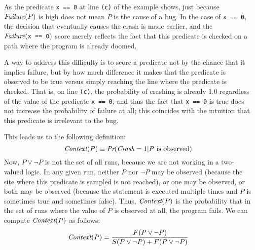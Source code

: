 As the predicate {\tt x == 0} at line {\tt (c)} of the example
shows, just because $\textit{Failure}(P)$ is high does not
mean $P$ is the cause of a bug.  In the case of {\tt x == 0}, the
decision that eventually causes the crash is made earlier, and the
$\textit{Failure}(\mbox{\tt x == 0})$ score merely reflects the fact that this
predicate is checked on a path where the program is already doomed.


A way to address this difficulty is to score a predicate not by the chance
that it implies failure, but by how much difference it makes that the predicate
is observed to be true versus simply reaching the line where the predicate is checked.
That is, on line {\tt (c)}, the probability of crashing is already 1.0 regardless
of the value of the predicate {\tt x == 0}, and thus the fact that {\tt x == 0} is
true does not increase the probability of failure at all; this coincides with
the intuition that this predicate is irrelevant to the bug.

This leads us to the following definition:
\[
\issue{modified by Alice}
\context(P) \equiv \prob(\fail = 1 | P \mbox{ is observed})  
\]
Now, $P \lor \lnot P$ is not the set of all runs, because we are not working in a two-valued logic.
In any given run, neither $P$ nor $\lnot P$ may be observed (because the site where this predicate is
sampled is not reached), or one may be observed, or both may be observed (because the statement is executed
multiple times and $P$ is sometimes true and sometimes false).  Thus, $\textit{Context}(P)$ is the probability that
in the set of runs where the value of $P$ is observed at all, the program fails. We can compute $\textit{Context}(P)$ as follows:
\[ \textit{Context}(P) = \frac{F(P \lor \lnot P)}{S(P \lor \lnot P) + F(P \lor \lnot P)} \]

